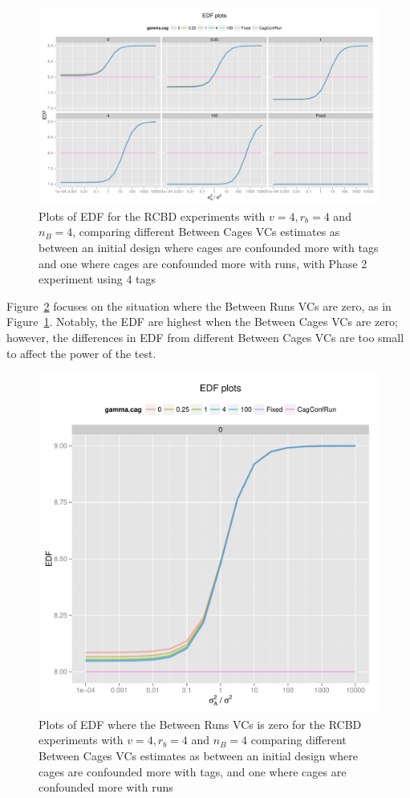 \documentclass[12pt,a4paper]{article}
\begin{document}
\begin{figure}[h!]
\centering
\includegraphics[width=1 \textwidth]{Graph/RBD442Tag4EDF.pdf}
\caption{Plots of EDF for the RCBD experiments with $v = 4, r_b = 4$ and $n_B = 4$, comparing different Between Cages VCs estimates as between an initial design where cages are confounded more with tags and one where cages are confounded more with runs, with Phase 2 experiment using 4 tags}
\label{fig:RCBD442Tag4EDF}
\end{figure}

Figure~\ref{fig:RCBD442Tag4EDFRun0} focuses on the situation where the Between Runs VCs are zero, as in Figure~\ref{fig:RCBD442Tag4EDF}. Notably, the EDF are highest when the Between Cages VCs are zero; however, the differences in EDF from different Between Cages VCs are too small to affect the power of the test.    

\begin{figure}[h!]
\centering
\includegraphics[width=.6 \textwidth]{Graph/RBD442Tag4EDFRun0.pdf}
\caption{Plots of EDF where the Between Runs VCs is zero for the RCBD experiments with $v = 4, r_b = 4$ and $n_B = 4$ comparing different Between Cages VCs estimates as between an initial design where cages are confounded more with tags, and one where cages are confounded more with runs}
\label{fig:RCBD442Tag4EDFRun0}
\end{figure}
\end{document}
